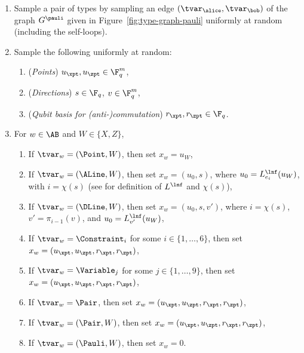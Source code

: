 \begin{enumerate}
\item Sample a pair of types by sampling an edge $(\tvar_\alice, \tvar_\bob)$ of
  the graph $G^\pauli$ given in Figure~\ref{fig:type-graph-pauli} uniformly at
  random (including the self-loops).
\item Sample the following uniformly at random:
	\begin{enumerate}
	\item (\emph{Points}) $u_\xpt,u_\zpt \in \F_q^m$,
	\item (\emph{Directions}) $s \in \F_q$, $v \in \F_q^m$,
  \item (\emph{Qubit basis for (anti-)commutation}) $r_\xpt,r_\zpt \in \F_q$.
	\end{enumerate}
\item For $w \in \AB$ and $W\in\{X,Z\}$,
	\begin{enumerate}
  \item If $\tvar_w = (\Point, W)$, then set $x_w = u_W$,
  \item If $\tvar_w = (\ALine, W)$, then set $x_w = (u_0,s)$, where $u_0 =
    L^\lnf_{e_i}(u_W)$, with $i = \chi(s)$ (see  for
    definition of $L^\lnf$ and $\chi(s)$),
  \item If $\tvar_w = (\DLine,W)$, then set $x_w = (u_0,s,v')$, where $i =
    \chi(s)$, $v' = \pi_{i-1}(v)$, and $u_0 = L^\lnf_{v'}(u_W)$,
  \item If $\tvar_w = \Constraint_i$ for some $i\in\{1,\ldots,6\}$, then set
    $x_w = (u_\xpt, u_\zpt, r_\xpt, r_\zpt)$,
  \item If $\tvar_w = \Variable_j$ for some $j\in\{1,\ldots,9\}$, then set $x_w
    = (u_\xpt, u_\zpt, r_\xpt, r_\zpt)$,
  \item If $\tvar_w = \Pair$, then set $x_w = (u_\xpt, u_\zpt, r_\xpt, r_\zpt)$,
  \item If $\tvar_w = (\Pair, W)$, then set $x_w = (u_\xpt, u_\zpt, r_\xpt, r_\zpt)$,
  \item If $\tvar_w = (\Pauli, W)$, then set $x_w = 0$.
	\end{enumerate}
\end{enumerate}

